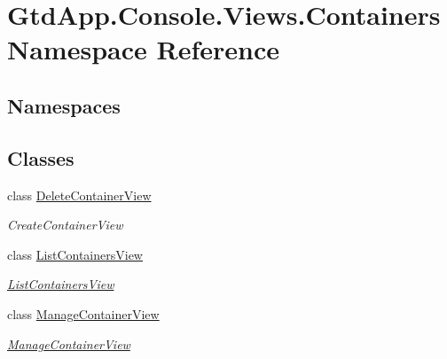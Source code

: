 \hypertarget{namespace_gtd_app_1_1_console_1_1_views_1_1_containers}{}\section{Gtd\+App.\+Console.\+Views.\+Containers Namespace Reference}
\label{namespace_gtd_app_1_1_console_1_1_views_1_1_containers}
\subsection*{Namespaces}
\begin{DoxyCompactItemize}
\end{DoxyCompactItemize}
\subsection*{Classes}
\begin{DoxyCompactItemize}
\item 
class \mbox{\hyperlink{class_gtd_app_1_1_console_1_1_views_1_1_containers_1_1_delete_container_view}{Delete\+Container\+View}}
\begin{DoxyCompactList}\small\item\em Create\+Container\+View \end{DoxyCompactList}\item 
class \mbox{\hyperlink{class_gtd_app_1_1_console_1_1_views_1_1_containers_1_1_list_containers_view}{List\+Containers\+View}}
\begin{DoxyCompactList}\small\item\em \mbox{\hyperlink{class_gtd_app_1_1_console_1_1_views_1_1_containers_1_1_list_containers_view}{List\+Containers\+View}} \end{DoxyCompactList}\item 
class \mbox{\hyperlink{class_gtd_app_1_1_console_1_1_views_1_1_containers_1_1_manage_container_view}{Manage\+Container\+View}}
\begin{DoxyCompactList}\small\item\em \mbox{\hyperlink{class_gtd_app_1_1_console_1_1_views_1_1_containers_1_1_manage_container_view}{Manage\+Container\+View}} \end{DoxyCompactList}\end{DoxyCompactItemize}
